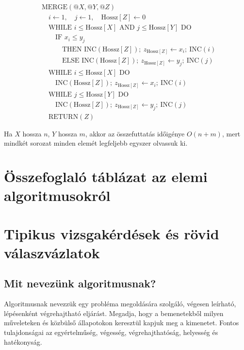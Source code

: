 \[
\begin{aligned}
&\text{MERGE}(@X,@Y,@Z)\\
&\quad i\leftarrow 1,\quad j\leftarrow 1,\quad \text{Hossz}[Z]\leftarrow 0\\
&\quad \text{WHILE } i\leq \text{Hossz}[X] \text{ AND } j\leq \text{Hossz}[Y] \text{ DO}\\
&\quad\quad \text{IF } x_i\leq y_j\\
&\quad\quad\quad \text{THEN INC}(\text{Hossz}[Z]);\ z_{\text{Hossz}[Z]}\leftarrow x_i;\ \text{INC}(i)\\
&\quad\quad\quad \text{ELSE INC}(\text{Hossz}[Z]);\ z_{\text{Hossz}[Z]}\leftarrow y_j;\ \text{INC}(j)\\
&\quad \text{WHILE } i\leq \text{Hossz}[X] \text{ DO}\\
&\quad\quad \text{INC}(\text{Hossz}[Z]);\ z_{\text{Hossz}[Z]}\leftarrow x_i;\ \text{INC}(i)\\
&\quad \text{WHILE } j\leq \text{Hossz}[Y] \text{ DO}\\
&\quad\quad \text{INC}(\text{Hossz}[Z]);\ z_{\text{Hossz}[Z]}\leftarrow y_j;\ \text{INC}(j)\\
&\quad \text{RETURN}(Z)
\end{aligned}
\]

Ha $X$ hossza $n$, $Y$ hossza $m$, akkor az összefuttatás időigénye $O(n+m)$, mert mindkét sorozat minden elemét legfeljebb egyszer olvassuk ki.

\section{Összefoglaló táblázat az elemi algoritmusokról}



\section{Tipikus vizsgakérdések és rövid válaszvázlatok}

\subsection{Mit nevezünk algoritmusnak?}

Algoritmusnak nevezzük egy probléma megoldására szolgáló, végesen leírható, lépésenként végrehajtható eljárást. Megadja, hogy a bemenetekből milyen műveleteken és közbülső állapotokon keresztül kapjuk meg a kimenetet. Fontos tulajdonságai az egyértelműség, végesség, végrehajthatóság, helyesség és hatékonyság.

